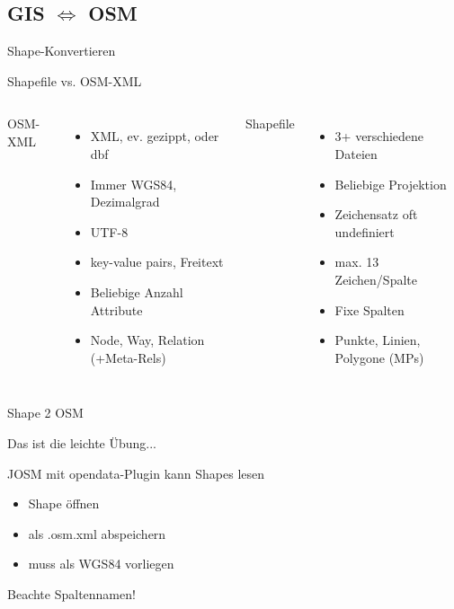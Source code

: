 \documentclass{beamer}
\begin{document}
\subsection{GIS $\iff$ OSM}

\begin{frame}{Shape-Konvertieren}

Shapefile vs. OSM-XML
\vspace{3mm}

 \begin{columns}[c]
	OSM-XML
		\begin{itemize}
			\item XML, ev. gezippt, oder dbf
			\item Immer WGS84, Dezimalgrad
			\item UTF-8
			\item key-value pairs, Freitext
			\item Beliebige Anzahl Attribute
			\item Node, Way, Relation (+Meta-Rels)
		\end{itemize}
	Shapefile
		\begin{itemize}
			\item 3+ verschiedene Dateien
			\item Beliebige Projektion
			\item Zeichensatz oft undefiniert
			\item max. 13 Zeichen/Spalte
			\item Fixe Spalten
			\item Punkte, Linien, Polygone (MPs)
		\end{itemize}
\end{columns}

\end{frame}

\begin{frame}{Shape 2 OSM}

	Das ist die leichte Übung...
	\vspace{3mm}

	JOSM mit opendata-Plugin kann Shapes lesen

	\begin{itemize}
		\item Shape öffnen
		\item als .osm.xml abspeichern
		\item muss als WGS84 vorliegen
	\end{itemize}
	Beachte Spaltennamen!
\end{frame}
\end{document}
